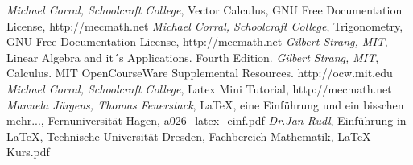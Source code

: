 \documentclass{article}
\begin{document}
\begin{thebibliography}    

     \textit{Michael Corral, Schoolcraft College},
		    Vector Calculus, GNU Free Documentation License, http://mecmath.net 
     \textit{Michael Corral, Schoolcraft College},
		    Trigonometry, GNU Free Documentation License, http://mecmath.net         
     \textit{Gilbert Strang, MIT},
		    Linear Algebra and it´s Applications. Fourth Edition.
     \textit{Gilbert Strang, MIT},
            Calculus. MIT OpenCourseWare Supplemental Resources. http://ocw.mit.edu    
     \textit{Michael Corral, Schoolcraft College},
            Latex Mini Tutorial, http://mecmath.net            
     \textit{Manuela J\"urgens, Thomas Feuerstack},
            LaTeX, eine Einf\"uhrung und ein bisschen mehr..., Fernuniversit\"at Hagen, a026\_latex\_einf.pdf
     \textit{Dr.Jan Rudl},
            Einf\"uhrung in LaTeX, Technische Universit\"at Dresden, Fachbereich Mathematik, LaTeX-Kurs.pdf            

\end{thebibliography}
\printindex
\end{document}
